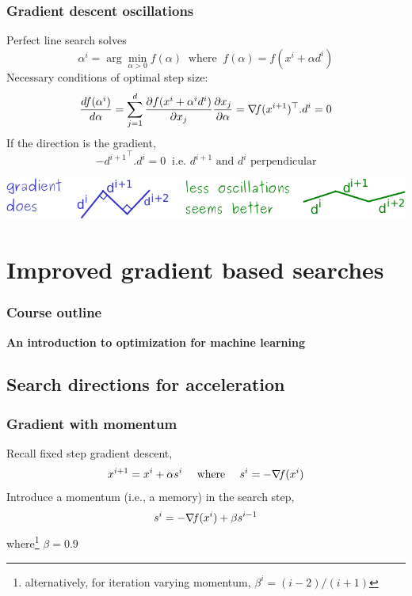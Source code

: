 \documentclass[12pt]{beamer}
\begin{document}
\begin{frame}
\frametitle{Gradient descent oscillations} 
Perfect line search solves
\begin{equation*}
\alpha^i = \arg\min_{\alpha>0} f(\alpha) ~\text{ where }~ f(\alpha) = f(x^i+\alpha d^i) 
\end{equation*}
Necessary conditions of optimal step size: 
\begin{equation*}
\frac{df(\alpha^i)}{d\alpha} = \sum_{j=1}^d \frac{\partial f(x^i + \alpha^i d^i)}{\partial x_j} \frac{\partial x_j}{\partial \alpha}
= \nabla\!{f}(x^{i+1})^\top . d^i = 0
\end{equation*}
If the direction is the gradient, 
\begin{equation*}
{-d^{i+1}}^\top . d^i = 0 ~\text{ i.e. } d^{i+1} \text{ and } d^i \text{ perpendicular}
\end{equation*}
\begin{center}
\includegraphics[width=\textwidth]{oscillations-crop.pdf} 
\end{center}
\end{frame}

\section{Improved gradient based searches}

\begin{frame}%
\frametitle{Course outline} 
\begin{center} \textbf{An introduction to optimization for machine learning} \end{center}
\tableofcontents[currentsection]
\end{frame}

\subsection{Search directions for acceleration}

\begin{frame}
\frametitle{Gradient with momentum} 
Recall fixed step gradient descent, 
\begin{equation*} 
x^{i+1} = x^i + \alpha s^i  \quad\text{ where }\quad s^i= -\nabla\!{f}(x^i) 
\end{equation*} 
Introduce a momentum (i.e., a memory) in the search step,
\begin{equation*} 
s^i = -\nabla\!{f}(x^i) + \beta s^{i-1}
\end{equation*} 
where\footnote{alternatively, for iteration varying momentum, $\beta^i=(i-2)/(i+1)$} $\beta = 0.9$
\wip
\end{frame}
\end{document}
